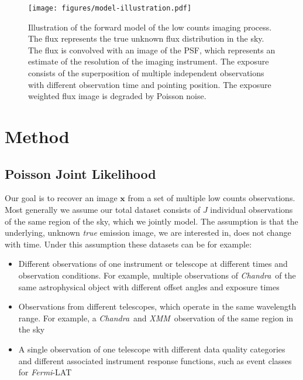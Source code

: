 \documentclass[twocolumn]{aastex631}
\newcommand{\chandra}{\textit{Chandra}~}
\newcommand{\xmm}{\textit{XMM}~}
\newcommand{\fermi}{\textit{Fermi}-LAT~}
\begin{document}
    \begin{figure*}
        \begin{centering}
            \texttt{[image: figures/model-illustration.pdf]}
            \caption{
                Illustration of the forward model of the low counts imaging process. The flux represents the true unknown flux distribution in the sky. The flux is convolved with an image of the PSF, which represents an estimate of the resolution of the imaging instrument. The exposure consists of the superposition of multiple independent observations with different observation time and pointing position. The exposure weighted flux image is degraded by Poisson noise.
            }
            \label{fig:model-illustration}
        \end{centering}
    \end{figure*}
    \section{Method}
    
    \subsection{Poisson Joint Likelihood}
    Our goal is to recover an image $\mathbf{x}$ from a set of multiple low counts observations. Most generally we assume our total dataset consists of $J$ individual observations of the same region of the sky, which we jointly model. The assumption is that the underlying, unknown \textit{true} emission image, we are interested in, does not change with time. Under this assumption these datasets can be for example:

    \begin{itemize}
        \item Different observations of one instrument or telescope at different times and observation conditions. For example, multiple observations of \chandra of the same astrophysical object with different offset angles and exposure times
        \item Observations from different telescopes, which operate in the same wavelength range. For example, a \chandra and \xmm observation of the same region in the sky
        \item A single observation of one telescope with different data quality categories and different associated instrument response functions, such as event classes for \fermi
    \end{itemize}
\end{document}
